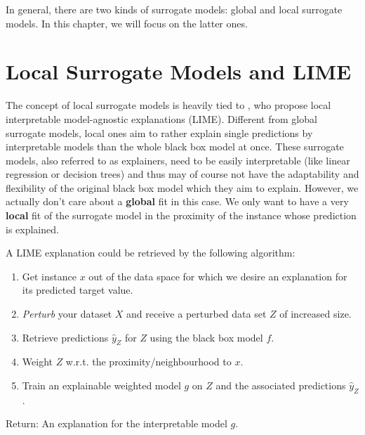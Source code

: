 \documentclass[
]{krantz}
\begin{document}
In general, there are two kinds of surrogate models: global and local surrogate models.
In this chapter, we will focus on the latter ones.

\hypertarget{local-surrogate-models-and-lime}{%
\section{Local Surrogate Models and LIME}\label{local-surrogate-models-and-lime}}

The concept of local surrogate models is heavily tied to \citet{ribeiro2016should}, who propose local interpretable model-agnostic explanations (LIME).
Different from global surrogate models, local ones aim to rather explain single predictions by interpretable models than the whole black box model at once.
These surrogate models, also referred to as explainers, need to be easily interpretable (like linear regression or decision trees) and thus may of course not have the adaptability and flexibility of the original black box model which they aim to explain.
However, we actually don't care about a \textbf{global} fit in this case.
We only want to have a very \textbf{local} fit of the surrogate model in the proximity of the instance whose prediction is explained.

A LIME explanation could be retrieved by the following algorithm:

\begin{enumerate}
\def\labelenumi{\arabic{enumi}.}
\item
  Get instance \(x\) out of the data space for which we desire an explanation for its predicted target value.
\item
  \emph{Perturb} your dataset \(X\) and receive a perturbed data set \(Z\) of increased size.
\item
  Retrieve predictions \(\hat{y}_{Z}\) for \(Z\) using the black box model \(f\).
\item
  Weight \(Z\) w.r.t. the proximity/neighbourhood to \(x\).
\item
  Train an explainable weighted model \(g\) on \(Z\) and the associated predictions \(\hat{y}_{Z}\).
\end{enumerate}

Return: An explanation for the interpretable model \(g\).
\end{document}
